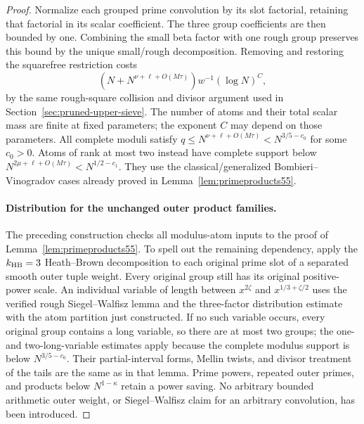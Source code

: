 \documentclass[11pt]{article}
\begin{document}
\begin{proof}
Normalize each grouped prime convolution by its slot factorial,
retaining that factorial in its scalar coefficient. The three
group coefficients are then bounded by one. Combining the small
beta factor with one rough group preserves this bound by the unique
small/rough decomposition. Removing and restoring the squarefree
restriction costs
\[
 (N+N^{\nu+\ell+O(M\tau)})w^{-1}(\log N)^C,
\]
by the same rough-square collision and divisor argument used in
Section~\ref{sec:pruned-upper-sieve}. The number of atoms and their
total scalar mass are finite at fixed parameters; the exponent $C$
may depend on those parameters. All complete moduli satisfy
$q\le N^{\nu+\ell+O(M\tau)}<N^{3/5-c_0}$ for some $c_0>0$.
Atoms of rank at most two instead have complete support below
$N^{2\mu+\ell+O(M\tau)}<N^{1/2-c_1}$.
They use the classical/generalized Bombieri--Vinogradov cases
already proved in Lemma~\ref{lem:primeproducts55}.

\paragraph{Distribution for the unchanged outer product families.}
The preceding construction checks all modulus-atom inputs to the
proof of Lemma~\ref{lem:primeproducts55}. To spell out the remaining
dependency, apply the $k_{\rm HB}=3$ Heath--Brown decomposition to
each original prime slot of a separated smooth outer tuple weight.
Every original group still has its original positive-power scale.
An individual variable of length between $x^{2\zeta}$ and
$x^{1/3+\zeta/2}$ uses the verified rough Siegel--Walfisz lemma
and the three-factor distribution estimate with the atom partition
just constructed. If no such variable occurs, every original
group contains a long variable, so there are at most two groups;
the one- and two-long-variable estimates apply because the complete
modulus support is below $N^{3/5-c_0}$. Their partial-interval forms,
Mellin twists, and divisor treatment of the tails are the same as
in that lemma. Prime powers, repeated outer primes, and products
below $N^{1-\kappa}$ retain a power saving. No arbitrary bounded
arithmetic outer weight, or Siegel--Walfisz claim for an arbitrary
convolution, has been introduced.


\end{proof}
\end{document}
